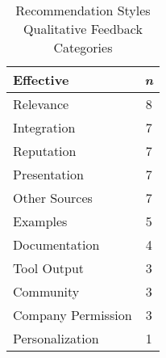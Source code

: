 \begin{table}[t]
\centering
\begin{tabular}{ |l|c| } \hline
 \textbf{Effective} & \textbf{\textit{n}} \\ \hline
 Relevance & 8 \\ \hline
 Integration & 7 \\ \hline
 Reputation & 7 \\ \hline
 Presentation & 7 \\ \hline
 Other Sources & 7 \\ \hline
 Examples & 5 \\ \hline
 Documentation & 4 \\ \hline
 Tool Output & 3 \\ \hline
 Community & 3 \\ \hline
 Company Permission & 3 \\ \hline
 Personalization & 1 \\ \hline
\end{tabular}
\caption{Recommendation Styles Qualitative Feedback Categories}
\label{tab:styles-comments}
\end{table}